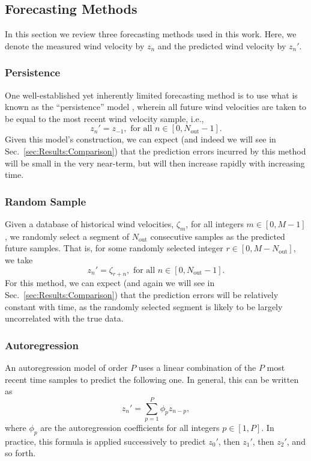 \documentclass[11pt, oneside]{article}
\newcommand{\secref}[1]{Sec.~\ref{#1}}
\begin{document}
\subsection{Forecasting Methods}\label{sec:Methods}
In this section we review three forecasting methods used in this work.
Here, we denote the measured wind velocity by $z_n$ and the predicted wind velocity by $z_n'$.

\subsubsection{Persistence}
One well-established yet inherently limited forecasting method is to use what is known as the ``persistence'' model \citep[Sec.~1.5]{Giebel2011}, wherein all future wind velocities are taken to be equal to the most recent wind velocity sample, i.e.,
\begin{equation}
z_n' = z_{-1}, \text{ for all } n \in [0, N_\text{out} - 1].
\end{equation}
Given this model's construction, we can expect (and indeed we will see in \secref{sec:Results:Comparison}) that the prediction errors incurred by this method will be small in the very near-term, but will then increase rapidly with increasing time.

\subsubsection{Random Sample}
Given a database of historical wind velocities, $\zeta_m$, for all integers $m \in [0, M-1]$, we randomly select a segment of $N_\text{out}$ consecutive samples as the predicted future samples.
That is, for some randomly selected integer $r \in [0, M - N_\text{out}]$, we take
\begin{equation}
z_n' = \zeta_{r+n}, \text{ for all } n \in [0, N_\text{out} - 1].
\end{equation}
For this method, we can expect (and again we will see in \secref{sec:Results:Comparison}) that the prediction errors will be relatively constant with time, as the randomly selected segment is likely to be largely uncorrelated with the true data.

\subsubsection{Autoregression}\label{sec:Methods:Autoregression}
An autoregression model of order $P$ uses a linear combination of the $P$ most recent time samples to predict the following one.
In general, this can be written as
\begin{equation}
z_n' = \sum_{p = 1}^P \phi_p z_{n-p},
\end{equation}
where $\phi_p$ are the autoregression coefficients for all integers $p \in [1, P]$.
In practice, this formula is applied successively to predict $z_0'$, then $z_1'$, then $z_2'$, and so forth.
\end{document}
